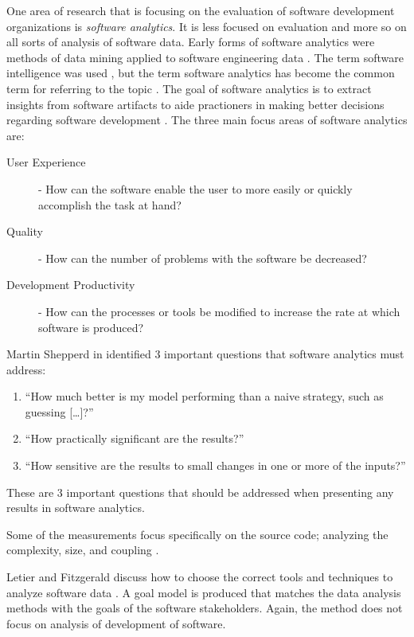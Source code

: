 \documentclass[SDSUThesis.tex]{subfiles}
\begin{document}
One area of research that is focusing on the evaluation of software development organizations
is \textit{software analytics}.  It is less focused on evaluation
and more so on all sorts of analysis of software data.  Early forms of 
software analytics were methods of data mining applied to software engineering data
\cite{Kaner2004,Xie2009,Taylor2010,Halkidi2011}. The term software intelligence was 
used \cite{Hassan2010}, but
the term software analytics has become the common term for referring to the topic \cite{Zhang2011}.
The goal of software analytics is to extract insights
from software artifacts to aide practioners in making better decisions regarding software
development \cite{Zhang2013}.  The three main focus areas of software analytics are:
\begin{description}
    \item[User Experience] - How can the software enable the user to more easily or quickly 
        accomplish the task at hand?
    \item[Quality] - How can the number of problems with the software be decreased?
    \item[Development Productivity] - How can the processes or tools be modified to increase 
        the rate at which software is produced? 
\end{description}

Martin Shepperd in \cite{Hassan2013} identified 3 important questions that software
analytics must address:
\begin{enumerate}
    \item ``How much better is my model performing than a naive strategy, such as guessing [\ldots]?''
    \item ``How practically significant are the results?''
    \item ``How sensitive are the results to small changes in one or more of the inputs?''
\end{enumerate}
These are 3 important questions that should be addressed when presenting any results in
software analytics.

Some of the measurements focus specifically on the source code; analyzing the 
complexity, size, and coupling \cite{Tosi2012}. 

Letier and Fitzgerald discuss how to choose the correct tools and techniques to analyze
software data \cite{Letier2013}.  A goal model is produced that matches the data analysis methods
with the goals of the software stakeholders.  Again, the method does not focus
on analysis of development of software.
\end{document}
